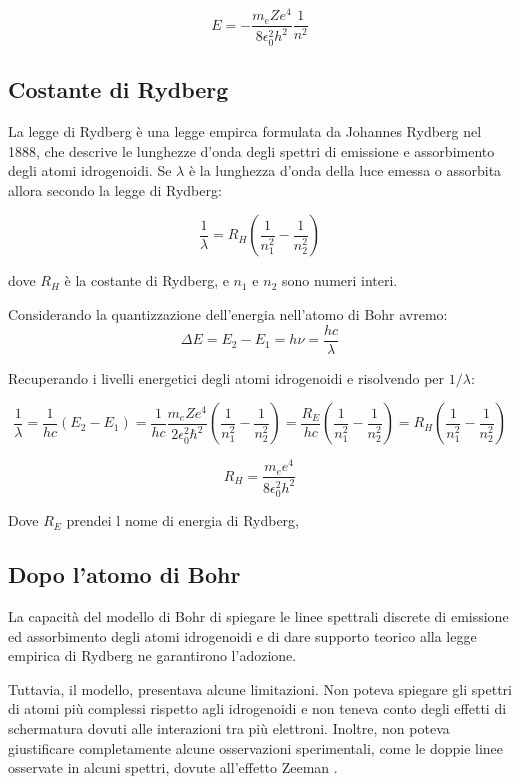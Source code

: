 \documentclass[12pt,a4paper]{report}
\begin{document}
\[ E = - \frac{m_e Z e^4}{8 \epsilon_0^2 h^2} \frac{1}{n^2} \]

\subsection{Costante di Rydberg}

La legge di Rydberg è una legge empirca formulata da Johannes Rydberg nel 1888, che descrive le lunghezze d'onda degli spettri di emissione e assorbimento degli atomi idrogenoidi. Se \(\lambda\) è la lunghezza d'onda della luce emessa o assorbita allora secondo la legge di Rydberg:

\[ \frac{1}{\lambda} = R_H \left( \frac{1}{n_1^2} - \frac{1}{n_2^2} \right) \]

dove \(R_H\) è la costante di Rydberg, e \(n_1\) e \(n_2\) sono numeri interi.

Considerando la quantizzazione dell'energia nell'atomo di Bohr avremo:
\[\Delta E = E_2 - E_1 = h\nu = \frac{hc}{\lambda}\]

Recuperando i livelli energetici degli atomi idrogenoidi e risolvendo per \(1/\lambda\):

\[\frac{1}{\lambda}=\frac{1}{hc}\left(E_2 - E_1\right) 
    = \frac{1}{hc} \frac{m_e Z e^4}{2 \epsilon_0^2 \hbar^2}\left(\frac{1}{n_1^2} - \frac{1}{n_2^2}\right)
    = \frac{R_E}{hc}\left(\frac{1}{n_1^2} - \frac{1}{n_2^2}\right) = R_H\left(\frac{1}{n_1^2} - \frac{1}{n_2^2}\right) \]

\[ R_H = \frac{m_e e^4}{8 \epsilon_0^2 h^2} \]

Dove \(R_E\) prendei l nome di energia di Rydberg,

\subsection{Dopo l'atomo di Bohr}

La capacità del modello di Bohr di spiegare le linee spettrali discrete di emissione ed assorbimento degli atomi idrogenoidi e di dare supporto teorico alla legge empirica di Rydberg ne garantirono l'adozione.

Tuttavia, il modello, presentava alcune limitazioni. Non poteva spiegare gli spettri di atomi più complessi rispetto agli idrogenoidi e non teneva conto degli effetti di schermatura dovuti alle interazioni tra più elettroni. Inoltre, non poteva giustificare completamente alcune osservazioni sperimentali, come le doppie linee osservate in alcuni spettri, dovute all'effetto Zeeman \cite{ZeemanEffect}.
\end{document}
